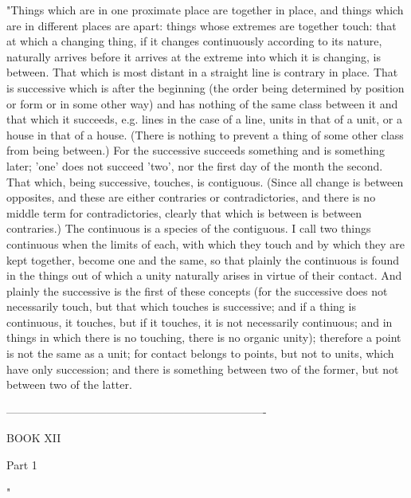 "Things which are in one proximate place are together in place, and
things which are in different places are apart: things whose extremes
are together touch: that at which a changing thing, if it changes
continuously according to its nature, naturally arrives before it
arrives at the extreme into which it is changing, is between. That
which is most distant in a straight line is contrary in place. That
is successive which is after the beginning (the order being determined
by position or form or in some other way) and has nothing of the same
class between it and that which it succeeds, e.g. lines in the case
of a line, units in that of a unit, or a house in that of a house.
(There is nothing to prevent a thing of some other class from being
between.) For the successive succeeds something and is something later;
'one' does not succeed 'two', nor the first day of the month the second.
That which, being successive, touches, is contiguous. (Since all change
is between opposites, and these are either contraries or contradictories,
and there is no middle term for contradictories, clearly that which
is between is between contraries.) The continuous is a species of
the contiguous. I call two things continuous when the limits of each,
with which they touch and by which they are kept together, become
one and the same, so that plainly the continuous is found in the things
out of which a unity naturally arises in virtue of their contact.
And plainly the successive is the first of these concepts (for the
successive does not necessarily touch, but that which touches is successive;
and if a thing is continuous, it touches, but if it touches, it is
not necessarily continuous; and in things in which there is no touching,
there is no organic unity); therefore a point is not the same as a
unit; for contact belongs to points, but not to units, which have
only succession; and there is something between two of the former,
but not between two of the latter. 

----------------------------------------------------------------------

BOOK XII

Part 1 

"

